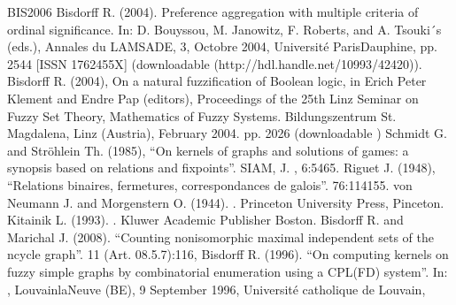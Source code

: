 \documentclass[a4paper,12pt,english]{sphinxhowto}
\begin{document}
\begin{sphinxthebibliography}{BIS\sphinxhyphen{}2006}
\sphinxAtStartPar
Bisdorff R. (2004). Preference aggregation with multiple criteria of ordinal significance. In: D. Bouyssou, M. Janowitz, F. Roberts, and A. Tsouki´s (eds.), Annales du LAMSADE, 3, Octobre 2004, Université Paris\sphinxhyphen{}Dauphine, pp. 25\sphinxhyphen{}44 {[}ISSN 1762\sphinxhyphen{}455X{]} (downloadable  (http://hdl.handle.net/10993/42420)).
\sphinxAtStartPar
Bisdorff R. (2004), On a natural fuzzification of Boolean logic, in Erich Peter Klement and Endre Pap (editors), Proceedings of the 25th Linz Seminar on Fuzzy Set Theory, Mathematics of Fuzzy Systems. Bildungszentrum St. Magdalena, Linz (Austria), February 2004. pp. 20\sphinxhyphen{}26 (downloadable )
\sphinxAtStartPar
Schmidt G. and Ströhlein Th. (1985), “On kernels of graphs and solutions of games: a synopsis based on relations and fixpoints”. SIAM, J. , 6:54\textendash{}65.
\sphinxAtStartPar
Riguet J. (1948), “Relations binaires, fermetures, correspondances de galois”.  76:114\textendash{}155.
\sphinxAtStartPar
von Neumann J. and Morgenstern O. (1944). . Princeton University Press, Pinceton.
\sphinxAtStartPar
Kitainik L. (1993). . Kluwer Academic Publisher Boston.
\sphinxAtStartPar
Bisdorff R. and Marichal J. (2008). “Counting non\sphinxhyphen{}isomorphic maximal independent sets
of the n\sphinxhyphen{}cycle graph”.  11 (Art. 08.5.7):1\textendash{}16, 
\sphinxAtStartPar
Bisdorff R. (1996). “On computing kernels on fuzzy simple graphs by combinatorial
enumeration using a CPL(FD) system”. In: , Louvain\sphinxhyphen{}la\sphinxhyphen{}Neuve (BE), 9 September 1996, Université catholique
de Louvain, 

\end{sphinxthebibliography}
\end{document}

